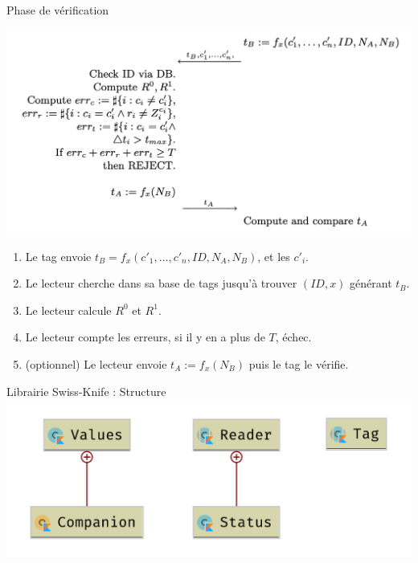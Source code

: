 \documentclass[aspectratio=169]{beamer}
\begin{document}
\begin{frame}{Phase de vérification}
  \begin{multicols}{2}
    \begin{minipage}[c]{\linewidth}
      \centering
      \bigskip
      \bigskip
      \bigskip
      \includegraphics[width=\linewidth]{../assets/sk-phase3}
    \end{minipage}

    \begin{minipage}[t]{\linewidth}
      \begin{enumerate}
        \item Le tag envoie $t_B = f_x(c'_1, \hdots, c'_n, ID, N_A, N_B)$, et les $c'_i$.
        \item Le lecteur cherche dans sa base de tags jusqu'à trouver $(ID, x)$ générant $t_B$.
        \item Le lecteur calcule $R^0$ et $R^1$.
        \item Le lecteur compte les erreurs, si il y en a plus de $T$, échec.
        \item (optionnel) Le lecteur envoie $t_A := f_x(N_B)$ puis le tag le vérifie.
      \end{enumerate}
    \end{minipage}
  \end{multicols}
\end{frame}

\begin{frame}{Librairie Swiss-Knife : Structure}
  \centering
  \includegraphics[width=.8\linewidth]{../assets/uml_jar.png}
\end{frame}
\end{document}
